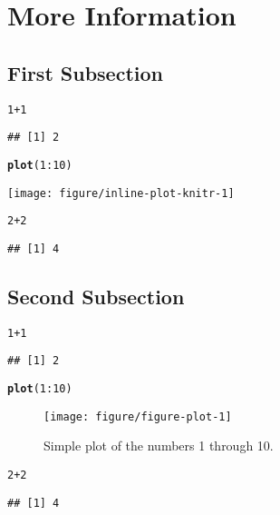 \documentclass{article}\usepackage[]{graphicx}\usepackage[]{color}
\makeatletter
\def\maxwidth{ %
  \ifdim\Gin@nat@width>\linewidth
    \linewidth
  \else
    \Gin@nat@width
  \fi
}
\newcommand{\hlnum}[1]{\textcolor[rgb]{0.686,0.059,0.569}{#1}}%
\newcommand{\hlopt}[1]{\textcolor[rgb]{0,0,0}{#1}}%
\newcommand{\hlstd}[1]{\textcolor[rgb]{0.345,0.345,0.345}{#1}}%
\newcommand{\hlkwd}[1]{\textcolor[rgb]{0.737,0.353,0.396}{\textbf{#1}}}%
\newenvironment{kframe}{%
 \def\at@end@of@kframe{}%
 \ifinner\ifhmode%
  \def\at@end@of@kframe{\end{minipage}}%
  \begin{minipage}{\columnwidth}%
 \fi\fi%
 \def\FrameCommand##1{\hskip\@totalleftmargin \hskip-\fboxsep
 \colorbox{shadecolor}{##1}\hskip-\fboxsep
     \hskip-\linewidth \hskip-\@totalleftmargin \hskip\columnwidth}%
 \MakeFramed {\advance\hsize-\width
   \@totalleftmargin\z@ \linewidth\hsize
   \@setminipage}}%
 {\par\unskip\endMakeFramed%
 \at@end@of@kframe}
\newenvironment{knitrout}{}{} %
\makeatother
\begin{document}
\section{More Information}
\label{sec:MoreInfo}

\subsection{First Subsection}
\label{FirstSub}

\begin{knitrout}
\color{fgcolor}\begin{kframe}
\begin{alltt}
\hlnum{1} \hlopt{+} \hlnum{1}
\end{alltt}
\begin{verbatim}
## [1] 2
\end{verbatim}
\begin{alltt}
\hlkwd{plot}\hlstd{(}\hlnum{1}\hlopt{:}\hlnum{10}\hlstd{)}
\end{alltt}
\end{kframe}
\texttt{[image: figure/inline-plot-knitr-1]} 
\begin{kframe}\begin{alltt}
\hlnum{2} \hlopt{+} \hlnum{2}
\end{alltt}
\begin{verbatim}
## [1] 4
\end{verbatim}
\end{kframe}
\end{knitrout}

\subsection{Second Subsection}
\label{SecondSub}

\begin{knitrout}
\color{fgcolor}\begin{kframe}
\begin{alltt}
\hlnum{1} \hlopt{+} \hlnum{1}
\end{alltt}
\begin{verbatim}
## [1] 2
\end{verbatim}
\begin{alltt}
\hlkwd{plot}\hlstd{(}\hlnum{1}\hlopt{:}\hlnum{10}\hlstd{)}
\end{alltt}
\end{kframe}\begin{figure}
\texttt{[image: figure/figure-plot-1]} \caption[Simple plot of the numbers 1 through 10]{Simple plot of the numbers 1 through 10.}\label{fig:figure-plot}
\end{figure}

\begin{kframe}\begin{alltt}
\hlnum{2} \hlopt{+} \hlnum{2}
\end{alltt}
\begin{verbatim}
## [1] 4
\end{verbatim}
\end{kframe}
\end{knitrout}
\end{document}
